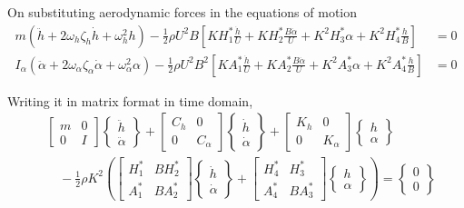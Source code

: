 \documentclass[a4paper, 12pt]{report}
\begin{document}
On substituting aerodynamic forces in the equations of motion
\begin{align}
    m(\ddot{h} + 2\omega_h\zeta_h \dot{h} + \omega_h^2 h)
    - \frac{1}{2}\rho U^2 B \left[KH_1^* \frac{\dot{h}}{U} + KH_2^* \frac{B\dot{\alpha}}{U}
    + K^2H_3^* \alpha + K^2H_4^* \frac{h}{B}\right] &= 0 \\
    I_\alpha(\ddot{\alpha} + 2\omega_{\alpha}\zeta_{\alpha} \dot{\alpha} + \omega_{\alpha}^2 \alpha)
    - \frac{1}{2}\rho U^2 B^2 \left[KA_1^* \frac{\dot{h}}{U} + KA_2^* \frac{B\dot{\alpha}}{U}
    + K^2A_3^* \alpha + K^2A_4^* \frac{h}{B}\right] &= 0
\end{align}

Writing it in matrix format in time domain,
\begin{equation}
\begin{split}
    &\begin{bmatrix} m & 0 \\ 0 & I \end{bmatrix}
    \begin{Bmatrix} \ddot{h} \\ \ddot{\alpha} \end{Bmatrix}
    + \begin{bmatrix} C_h & 0 \\ 0 & C_{\alpha} \end{bmatrix}
    \begin{Bmatrix} \dot{h} \\ \dot{\alpha} \end{Bmatrix}
    + \begin{bmatrix} K_h & 0 \\ 0 & K_{\alpha} \end{bmatrix}
    \begin{Bmatrix} h \\ \alpha \end{Bmatrix} \\
    &\quad - \frac{1}{2}\rho K^2
    \left(
    \begin{bmatrix} H_1^* & BH_2^* \\ A_1^* & BA_2^* \end{bmatrix}
    \begin{Bmatrix} \dot{h} \\ \dot{\alpha} \end{Bmatrix}
    + \begin{bmatrix} H_4^* & H_3^* \\ A_4^* & BA_3^* \end{bmatrix}
    \begin{Bmatrix} h \\ \alpha \end{Bmatrix}
    \right)
    = \begin{Bmatrix} 0 \\ 0 \end{Bmatrix}
\end{split}
\end{equation}
\end{document}
